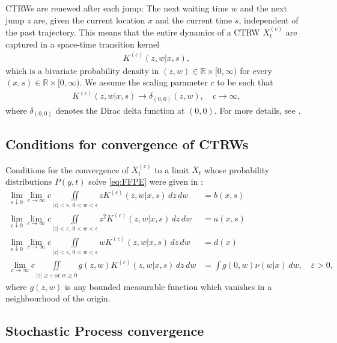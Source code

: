 \documentclass[a4paper,12pt]{elsarticle}
\numberwithin{equation}{section}
\theoremstyle{plain}
\theoremstyle{definition}
\theoremstyle{remark}
\numberwithin{equation}{section}
\newcommand{\spc}{\mathbb R}
\newcommand{\spctim}{\spc \times [0,\infty)}
\newcommand{\1}{\mathbf 1}
\begin{document}
CTRWs are renewed after each jump: The next waiting time $w$ and the next jump $z$ are, given the current location $x$ and the current time $s$, independent of the past trajectory.  This means that the entire dynamics of a CTRW $X^{(c)}_t$ are captured in a space-time transition kernel 
\begin{align} \label{eq:STJK}
K^{(c)}(z,w | x,s),
\end{align}
which is a bivariate probability density in $(z,w) \in \spctim$ for every $(x,s) \in \spctim$.  We assume the scaling parameter $c$ to be such that 
\begin{align}
K^{(c)}(z,w | x,s) \to \delta_{(0,0)}(z,w), \quad c \to \infty,
\end{align}
where $\delta_{(0,0)}$ denotes the Dirac delta function at $(0,0)$. For more details, see \cite{Straka17}. 


\subsection{Conditions for convergence of CTRWs}

Conditions for the convergence of $X^{(c)}_t$ to a limit $X_t$ whose probability distributions $P(y,t)$ solve \eqref{eq:FFPE} were given in \cite{Straka17}:
\begin{align} \label{eq:cond1}
\lim_{\epsilon \downarrow 0} \lim_{c \to \infty}
c \iint\limits_{|z|< \epsilon,\,0<  w < \epsilon} z K^{(c)}(z,w | x,s)\,dz\,dw &= b(x,s)
\\ \label{eq:cond2}
\lim_{\epsilon \downarrow 0} \lim_{c \to \infty}
c \iint\limits_{|z|< \epsilon, \,0<w < \epsilon} z^2 K^{(c)}(z,w | x,s)\,dz\,dw &= a(x,s)
\\ \label{eq:cond3}
\lim_{\epsilon \downarrow 0} \lim_{c \to \infty}
c \iint\limits_{|z|< \epsilon, \,0<w < \epsilon} w K^{(c)}(z,w | x,s)\,dz\,dw &= d(x)
\\
\label{eq:cond4}
\lim_{c \to \infty}
c \iint\limits_{|z| \ge \varepsilon \text{ or } w \ge 0} g(z,w) K^{(c)} (z,w | x,s)\,dz\,dw &= \int g(0,w) \nu(w|x)\,dw, \quad \varepsilon > 0,
\end{align}
where $g(z,w)$ is any bounded measurable function which vanishes in a neighbourhood of the origin. 


\subsection{Stochastic Process convergence}
\end{document}
